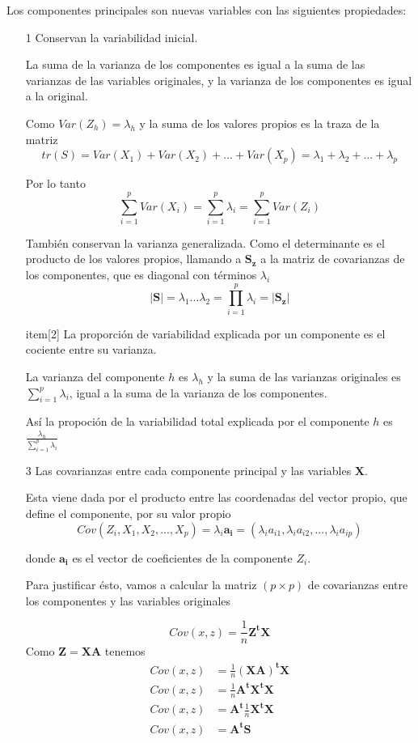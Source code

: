 \documentclass[12pt,letterpaper]{report} %
\begin{document}
Los componentes principales son nuevas variables con las siguientes propiedades:
\begin{itemize}
\item[1]  Conservan la variabilidad inicial.

La suma de la varianza de los componentes es igual a la suma de las varianzas de las variables originales, y la varianza de los componentes es igual a la original.

Como $Var(Z_h)=\lambda_h$ y la suma de los valores propios es la traza de la matriz
$$tr(S)  = Var(X_1)+Var(X_2)+...+Var(X_p)=\lambda_1+\lambda_2+...+\lambda_p$$

Por lo tanto
$$ \sum_{i=1}^p Var(X_i) =\sum_{i=1}^p \lambda_i = \sum_{i=1}^p Var(Z_i)$$

También conservan la varianza generalizada. Como el determinante es el producto de los valores propios, llamando a $\mathbf{S_z}$ a la matriz de covarianzas de los componentes, que es diagonal con términos $\lambda_i$
$$|\mathbf{S}|=\lambda_1...\lambda_2=\prod_{i=1}^p \lambda_i = |\mathbf{S_z}|$$

item[2] La proporción de variabilidad explicada por un componente es el cociente entre su varianza. 

La varianza del componente $h$ es $\lambda_h$ y la suma de las varianzas originales es $\sum_{i=1}^p \lambda_i$, igual a la suma de la varianza de los componentes.

Así la propoción de la variabilidad total explicada por el componente $h$ es $\frac{\lambda_h}{\sum_{i=1}^p \lambda_i}$

\item[3]  Las covarianzas entre cada componente principal y las variables $\mathbf{X}$.

Esta viene dada por el producto entre las coordenadas del vector propio, que define el componente, por su valor propio
$$Cov(Z_i,X_1,X_2,...,X_p)=\lambda_i\mathbf{a_i}=(\lambda_ia_{i1},\lambda_ia_{i2},...,\lambda_ia_{ip})$$

donde $\mathbf{a_i}$ es el vector de coeficientes de la componente $Z_i$.

Para justificar ésto, vamos a calcular la matriz $(p\times p)$ de covarianzas entre los componentes y las variables originales

$$Cov(x,z)=\frac{1}{n}\mathbf{Z^tX}$$
Como $\mathbf{Z}=\mathbf{XA}$ tenemos
$$
\begin{array}{rl}
Cov(x,z) & = \frac{1}{n}\mathbf{(XA)^tX}\\
Cov(x,z) & =  \frac{1}{n}\mathbf{A^tX^tX}\\
Cov(x,z) & =  \mathbf{A^t}\frac{1}{n}\mathbf{X^tX}\\
Cov(x,z) & = \mathbf{A^tS}
\end{array}
$$


\end{itemize}
\end{document}
